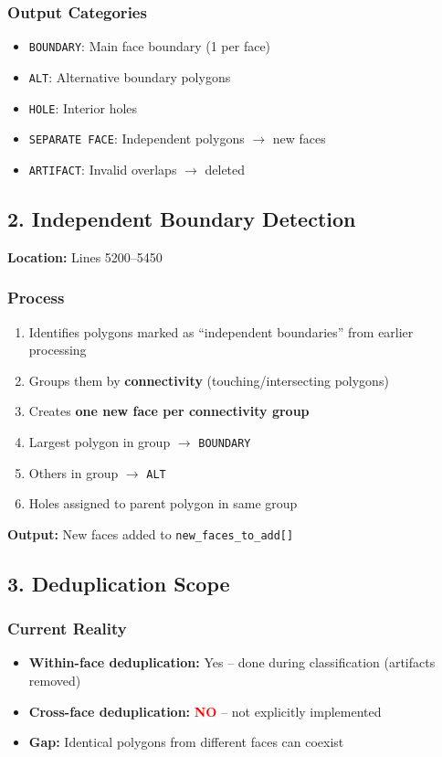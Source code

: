 \documentclass[11pt]{article}
\begin{document}
\subsubsection{Output Categories}
\begin{itemize}
    \item \texttt{BOUNDARY}: Main face boundary (1 per face)
    \item \texttt{ALT}: Alternative boundary polygons
    \item \texttt{HOLE}: Interior holes
    \item \texttt{SEPARATE FACE}: Independent polygons $\rightarrow$ new faces
    \item \texttt{ARTIFACT}: Invalid overlaps $\rightarrow$ deleted
\end{itemize}

\subsection{2. Independent Boundary Detection}
\textbf{Location:} Lines 5200--5450

\subsubsection{Process}
\begin{enumerate}
    \item Identifies polygons marked as ``independent boundaries'' from earlier processing
    \item Groups them by \textbf{connectivity} (touching/intersecting polygons)
    \item Creates \textbf{one new face per connectivity group}
    \item Largest polygon in group $\rightarrow$ \texttt{BOUNDARY}
    \item Others in group $\rightarrow$ \texttt{ALT}
    \item Holes assigned to parent polygon in same group
\end{enumerate}

\textbf{Output:} New faces added to \texttt{new\_faces\_to\_add[]}

\subsection{3. Deduplication Scope}
\subsubsection{Current Reality}
\begin{itemize}
    \item \textbf{Within-face deduplication:} Yes -- done during classification (artifacts removed)
    \item \textbf{Cross-face deduplication:} \textcolor{red}{\textbf{NO}} -- not explicitly implemented
    \item \textbf{Gap:} Identical polygons from different faces can coexist
\end{itemize}
\end{document}
